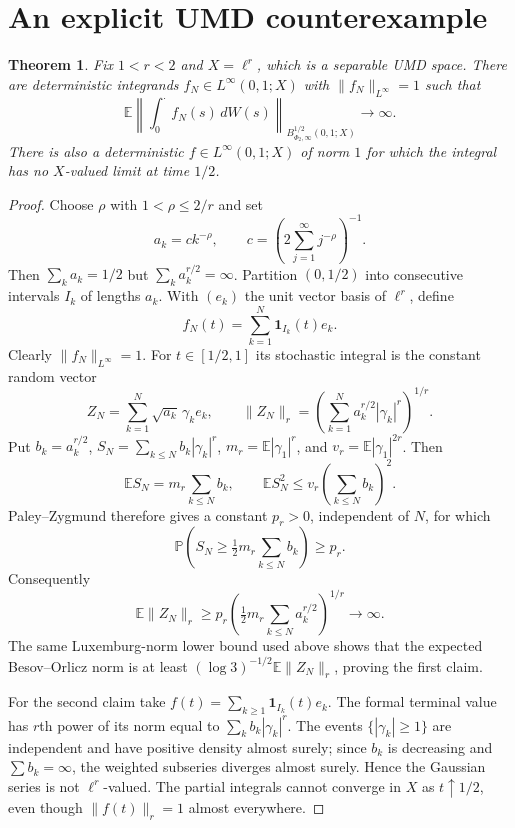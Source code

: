 \documentclass[11pt]{article}
\newtheorem{theorem}{Theorem}
\newcommand{\E}{\mathbb E}
\newcommand{\Pp}{\mathbb P}
\newcommand{\PhiTwo}{\Phi_2}
\begin{document}
\section{An explicit UMD counterexample}

\begin{theorem}
Fix $1<r<2$ and $X=\ell^r$, which is a separable UMD space.  There are
deterministic integrands $f_N\in L^\infty(0,1;X)$ with
$\|f_N\|_{L^\infty}=1$ such that
\[
 \E\left\|\int_0^\cdot f_N(s)\,dW(s)\right\|_
 {B^{1/2}_{\PhiTwo,\infty}(0,1;X)}\longrightarrow\infty.
\]
There is also a deterministic $f\in L^\infty(0,1;X)$ of norm $1$ for which
the integral has no $X$-valued limit at time $1/2$.
\end{theorem}

\begin{proof}
Choose $\rho$ with $1<\rho\le2/r$ and set
\[
 a_k=c k^{-\rho},\qquad
 c=\left(2\sum_{j=1}^\infty j^{-\rho}\right)^{-1}.
\]
Then $\sum_ka_k=1/2$ but $\sum_ka_k^{r/2}=\infty$.  Partition $(0,1/2)$
into consecutive intervals $I_k$ of lengths $a_k$.  With $(e_k)$ the unit
vector basis of $\ell^r$, define
\[
 f_N(t)=\sum_{k=1}^N\mathbf1_{I_k}(t)e_k.
\]
Clearly $\|f_N\|_{L^\infty}=1$.  For $t\in[1/2,1]$ its stochastic integral
is the constant random vector
\[
 Z_N=\sum_{k=1}^N\sqrt{a_k}\,\gamma_ke_k,
 \qquad
 \|Z_N\|_r=\left(\sum_{k=1}^Na_k^{r/2}|\gamma_k|^r\right)^{1/r}.
\]
Put $b_k=a_k^{r/2}$, $S_N=\sum_{k\le N}b_k|\gamma_k|^r$,
$m_r=\E|\gamma_1|^r$, and $v_r=\E|\gamma_1|^{2r}$.  Then
\[
 \E S_N=m_r\sum_{k\le N}b_k,
 \qquad
 \E S_N^2\le v_r\left(\sum_{k\le N}b_k\right)^2.
\]
Paley--Zygmund therefore gives a constant $p_r>0$, independent of $N$, for
which
\[
 \Pp\left(S_N\ge\tfrac12m_r\sum_{k\le N}b_k\right)\ge p_r.
\]
Consequently
\[
 \E\|Z_N\|_r
 \ge p_r\left(\tfrac12m_r\sum_{k\le N}a_k^{r/2}\right)^{1/r}
 \longrightarrow\infty.
\]
The same Luxemburg-norm lower bound used above shows that the expected
Besov--Orlicz norm is at least $(\log3)^{-1/2}\E\|Z_N\|_r$, proving the first
claim.

For the second claim take $f(t)=\sum_{k\ge1}\mathbf1_{I_k}(t)e_k$.  The
formal terminal value has $r$th power of its norm equal to
$\sum_kb_k|\gamma_k|^r$.  The events $\{|\gamma_k|\ge1\}$ are independent
and have positive density almost surely; since $b_k$ is decreasing and
$\sum b_k=\infty$, the weighted subseries diverges almost surely.  Hence the
Gaussian series is not $\ell^r$-valued.  The partial integrals cannot converge
in $X$ as $t\uparrow1/2$, even though $\|f(t)\|_r=1$ almost everywhere.
\end{proof}
\end{document}
